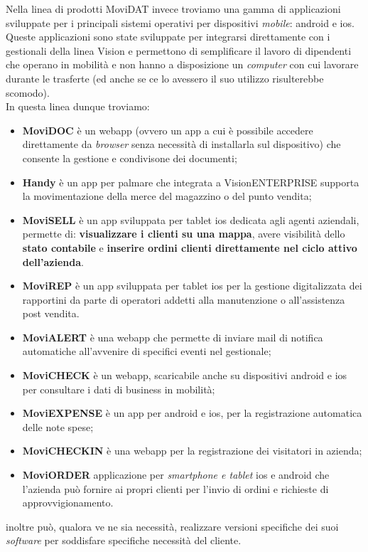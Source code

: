 Nella linea di prodotti MoviDAT invece troviamo una gamma di applicazioni sviluppate per i principali sistemi operativi per dispositivi 
\textit{mobile}: \gls{android} e \gls{ios}. Queste applicazioni sono state sviluppate per integrarsi direttamente con i gestionali 
della linea Vision e permettono di semplificare il lavoro di dipendenti che operano in mobilità e non hanno a disposizione un 
\textit{computer} con cui lavorare durante le trasferte (ed anche se ce lo avessero il suo utilizzo risulterebbe scomodo).\\
In questa linea dunque troviamo:
\begin{itemize}
    \item \textbf{MoviDOC} è un \gls{webapp} (ovvero un app a cui è possibile accedere direttamente da \textit{browser} senza 
          necessità di installarla sul dispositivo) che consente la gestione e condivisone dei documenti;
    \item \textbf{Handy} è un app per palmare che integrata a VisionENTERPRISE supporta la movimentazione della merce del magazzino o del punto vendita;
    \item \textbf{MoviSELL} è un app sviluppata per tablet \gls{ios} dedicata agli agenti aziendali, permette di: \textbf{visualizzare i 
          clienti su una mappa}, avere visibilità dello \textbf{stato contabile} e \textbf{inserire ordini clienti direttamente nel 
          ciclo attivo dell'azienda}.
    \item \textbf{MoviREP} è un app sviluppata per tablet \gls{ios} per la gestione digitalizzata dei rapportini da parte di operatori addetti alla manutenzione o 
          all'assistenza post vendita. 
    \item \textbf{MoviALERT} è una \gls{webapp} che permette di inviare mail di notifica automatiche all'avvenire di 
          specifici eventi nel gestionale;
    \item \textbf{MoviCHECK} è un \gls{webapp}, scaricabile anche su dispositivi \gls{android} e \gls{ios} per 
          consultare i dati di business in mobilità;
    \item \textbf{MoviEXPENSE} è un app per \gls{android} e \gls{ios}, per la registrazione automatica delle note 
          spese;
    \item \textbf{MoviCHECKIN} è una \gls{webapp} per la registrazione dei visitatori in azienda;
    \item \textbf{MoviORDER} applicazione per \textit{smartphone e tablet} \gls{ios} e \gls{android} che l’azienda può fornire ai propri clienti per l’invio di ordini e 
          richieste di approvvigionamento.
\end{itemize}
{\company} inoltre può, qualora ve ne sia necessità, realizzare versioni specifiche dei suoi \textit{software} per soddisfare specifiche necessità 
del cliente.

 